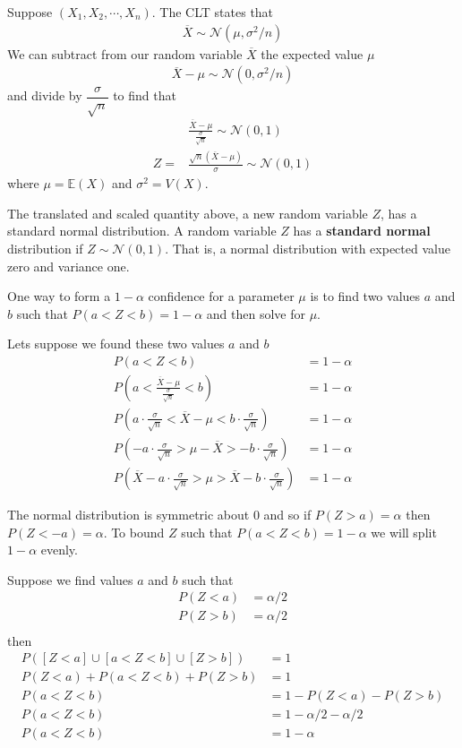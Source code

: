 Suppose $(X_{1},X_{2},\cdots,X_{n})$.
The CLT states that 
\begin{align}
    \overline{X} \sim \mathcal{N}(\mu,\sigma^{2}/n)
\end{align}
We can subtract from our random variable $\overline{X}$ the expected value $\mu$ 
\begin{align}
    \overline{X} - \mu \sim \mathcal{N}(0,\sigma^{2}/n)
\end{align}
and divide by $\dfrac{\sigma}{\sqrt{n}}$ to find that 
\begin{align}
    &\frac{\overline{X} - \mu}{\frac{\sigma}{\sqrt{n}}} \sim \mathcal{N}(0,1) \\ 
    Z=&\frac{\sqrt{n}(\overline{X} - \mu)}{\sigma} \sim \mathcal{N}(0,1)
\end{align}
where $\mu = \mathbb{E}(X)$ and $\sigma^{2} = V(X)$.

The translated and scaled quantity above, a new random variable $Z$, has a standard normal distribution. A random variable $Z$ has a \textbf{standard normal} distribution if $Z \sim \mathcal{N}(0,1)$. That is, a normal distribution with expected value zero and variance one. 

One way to form a $1-\alpha$ confidence for a parameter $\mu$ is to find two values $a$ and $b$ such that $P(a<Z<b) = 1-\alpha$ and then solve for $\mu$.   

Lets suppose we found these two values $a$ and $b$
\begin{align}
    P(a<Z<b) &= 1-\alpha\\
    P\left(a< \frac{\overline{X} - \mu}{\frac{\sigma}{\sqrt{n}}} <b \right) &= 1-\alpha\\
    P\left(a \cdot \frac{\sigma}{\sqrt{n}} < \overline{X} - \mu <b \cdot \frac{\sigma}{\sqrt{n}} \right) &= 1-\alpha\\
    P\left(-a \cdot \frac{\sigma}{\sqrt{n}} > \mu - \overline{X} > -b \cdot \frac{\sigma}{\sqrt{n}} \right) &= 1-\alpha\\
    P\left(\overline{X} -a \cdot \frac{\sigma}{\sqrt{n}} > \mu   > \overline{X} -b \cdot \frac{\sigma}{\sqrt{n}} \right) &= 1-\alpha
\end{align}


The normal distribution is symmetric about $0$ and so if $P( Z > a ) = \alpha$ then $P(Z < -a) = \alpha$.
To bound $Z$ such that $P(a<Z<b) = 1-\alpha$ we will split $1-\alpha$ evenly.

Suppose we find values $a$ and $b$ such that
\begin{align}
    P(Z<a) &= \alpha/2 \\ 
    P(Z>b) &= \alpha/2 \\
\end{align}
then 
\begin{align}
    P([Z<a] \cup [a<Z<b] \cup [Z>b] ) &= 1\\
    P(Z<a) + P(a<Z<b) + P(Z>b) &= 1\\
    P(a<Z<b) &= 1 - P(Z<a) - P(Z>b) \\ 
    P(a<Z<b) &= 1 - \alpha/2 - \alpha/2 \\
    P(a<Z<b) &= 1 - \alpha
\end{align}

